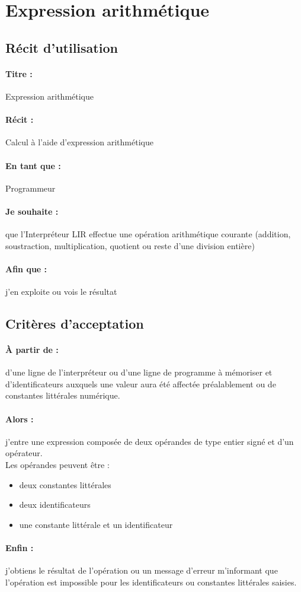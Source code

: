     \section{Expression arithmétique}
    \subsection*{Récit d'utilisation}

    \paragraph{Titre : } Expression arithmétique
    \paragraph{Récit : } Calcul à l'aide d'expression arithmétique
    \paragraph{En tant que : } Programmeur
    \paragraph{Je souhaite : } que l'Interpréteur LIR effectue une
    opération arithmétique courante (addition, soustraction,
    multiplication, quotient ou reste d'une division entière)
    \paragraph{Afin que : } j'en exploite ou vois le résultat

    \subsection*{Critères d'acceptation}

    \paragraph{À partir de : } d'une ligne de l'interpréteur ou d'une
    ligne de programme à mémoriser et d'identificateurs auxquels une
    valeur aura été affectée préalablement ou de constantes littérales
    numérique.

    \paragraph{Alors : } j'entre une expression composée de deux
    opérandes de type entier signé et d'un opérateur.
    \\ Les opérandes peuvent être :
    \begin{itemize}
        \item deux constantes littérales
        \item deux identificateurs
        \item une constante littérale et un identificateur
    \end{itemize}
    \paragraph{Enfin : } j'obtiens le résultat de l'opération ou un
    message d'erreur m'informant que l'opération est impossible pour les
    identificateurs ou constantes littérales saisies.
